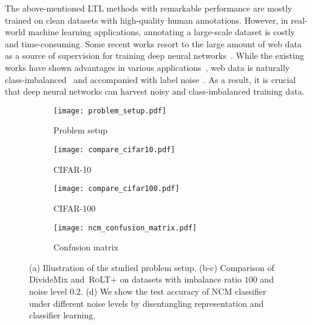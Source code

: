 \documentclass{article}
\def\algo{{\textsc{RoLT}}}
\begin{document}
The above-mentioned LTL methods with remarkable performance are mostly trained on clean datasets with high-quality human annotations. However, in real-world machine learning applications, annotating a large-scale dataset is costly and time-consuming. Some recent works resort to the large amount of web data as a source of supervision for training deep neural networks~\cite{webvision}. While the existing works have shown advantages in various applications~\cite{DBLP:conf/eccv/LiNX14,ma2018dimensionality}, web data is naturally class-imbalanced~\cite{li2020dividemix,li2021mopro} and accompanied with label noise~\cite{xu2019l_dmi,li2020dividemix,yao2020dualt,xia2021robust}. As a result, it is crucial that deep neural networks can harvest noisy and class-imbalanced training data. 


\begin{figure}[t]
    \centering
    \begin{subfigure}[b]{0.268\textwidth}
        \centering
        \texttt{[image: problem\_setup.pdf]}
        \caption{Problem setup} \label{fig:problem_setup}
    \end{subfigure}
    \begin{subfigure}[b]{0.244\textwidth}
        \centering
        \texttt{[image: compare\_cifar10.pdf]}
        \caption{CIFAR-10} \label{fig:dividemix_cifar10}
    \end{subfigure}
    \begin{subfigure}[b]{0.244\textwidth}
        \centering
        \texttt{[image: compare\_cifar100.pdf]}
        \caption{CIFAR-100} \label{fig:dividemix_cifar100}
    \end{subfigure}
    \begin{subfigure}[b]{0.223\textwidth}
        \centering
        \texttt{[image: ncm\_confusion\_matrix.pdf]}
        \caption{Confusion matrix} \label{fig:ncm_confusion_matrix}
    \end{subfigure}
    \caption{(a) Illustration of the studied problem setup. (b-c) Comparison of DivideMix and~\algo+ on  datasets with imbalance ratio $100$ and noise level $0.2$. (d) We show the test accuracy of NCM classifier under different noise levels by disentangling representation and classifier learning.} \end{figure}
\end{document}
